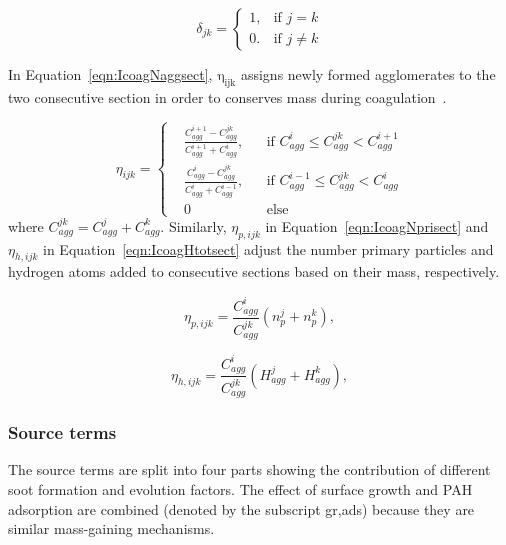\begin{equation}
	\delta_{jk}=
	\left\{
	\begin{array}{lr}
		1, & \text{if } j = k\\
		0. & \text{if } j \neq k
	\end{array}
	\right.
	\label{eqn:deltakronecker}
\end{equation}

In Equation~\eqref{eqn:IcoagNaggsect}, $\mathrm{\eta_{ijk}}$ assigns newly formed agglomerates to the two consecutive section in order to conserves mass during coagulation~\citep{park2005aerosol}.

\begin{equation}
	\eta_{ijk}=
	\left\{
	\begin{aligned}
	&\frac{C^{i+1}_{agg}-C^{jk}_{agg}}{C^{i+1}_{agg}+C^i_{agg}},
	&&
	\text{if } C^i_{agg} \le C^{jk}_{agg} < C^{i+1}_{agg}
	\\
	&\frac{C^{i}_{agg}-C^{jk}_{agg}}{C^{i}_{agg}+C^{i-1}_{agg}}, 
	&&
	\text{if } C^{i-1}_{agg} \le C^{jk}_{agg} < C^{i}_{agg}
	\\
	&0
	&&\text{else}
	\end{aligned}
	\right.
	\label{eqn:etacoag}
\end{equation}
\noindent where ${C^{jk}_{agg}=C^{j}_{agg}+C^{k}_{agg}}$. Similarly, $\eta_{p,ijk}$ in Equation~\eqref{eqn:IcoagNprisect} and $\eta_{h,ijk}$ in Equation~\eqref{eqn:IcoagHtotsect} adjust the number primary particles and hydrogen atoms added to consecutive sections based on their mass, respectively.

\begin{equation}
	\eta_{p,ijk}=
	\frac{C^i_{agg}}{C^{jk}_{agg}}
	\left(
		n^j_p + n^k_p
	\right)
	\label{eqn:etapcoag},
\end{equation}

\begin{equation}
	\eta_{h,ijk}=
	\frac{C^i_{agg}}{C^{jk}_{agg}}
	\left(
	H^j_{agg} + H^k_{agg}
	\right)
	\label{eqn:etahcoag},
\end{equation}

\subsubsection{Source terms}
The source terms are split into four parts showing the contribution of different soot formation and evolution factors. The effect of surface growth and PAH adsorption are combined (denoted by the subscript gr,ads) because they are similar mass-gaining mechanisms.

